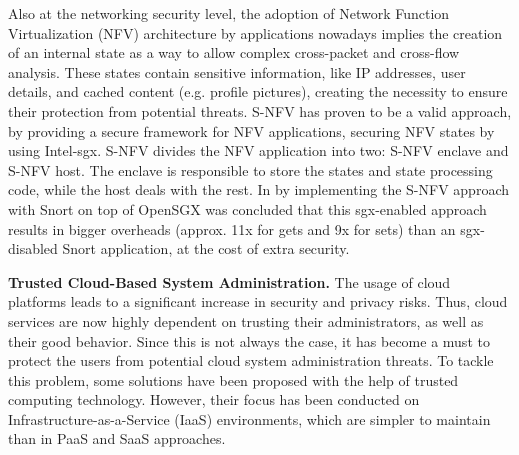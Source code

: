 Also at the networking security level, the adoption of Network Function Virtualization (NFV) architecture by applications nowadays implies the creation of an internal state as a way to allow complex cross-packet and cross-flow analysis. 
These states contain sensitive information, like IP addresses, user details, and cached content (e.g. profile pictures), creating the necessity to ensure their protection from potential threats.
S-NFV \cite{sNFVPaper} has proven to be a valid approach, by providing a secure framework for NFV applications, securing NFV states by using Intel-\gls{sgx}.
S-NFV divides the NFV application into two: S-NFV enclave and S-NFV host. The enclave is responsible to store the states and state processing code, while the host deals with the rest.
In \cite{sNFVPaper} by implementing the S-NFV approach with Snort \cite{snortPaper} on top of OpenSGX was
concluded that this \gls{sgx}-enabled approach results in bigger overheads (approx. 11x for
gets and 9x for sets) than an \gls{sgx}-disabled Snort application, at the cost of extra security.\newline

\textbf{Trusted Cloud-Based System Administration.}
The usage of cloud platforms leads to a significant increase in security and privacy risks. Thus, cloud services are now highly dependent on trusting their administrators, as well as their good behavior. Since this is not always the case, it has become a must to protect the users from potential cloud system administration threats. 
To tackle this problem, some solutions have been proposed with the help of trusted computing technology. However, their focus has been conducted on Infrastructure-as-a-Service (IaaS) environments, which are simpler to maintain than in PaaS and SaaS approaches.

